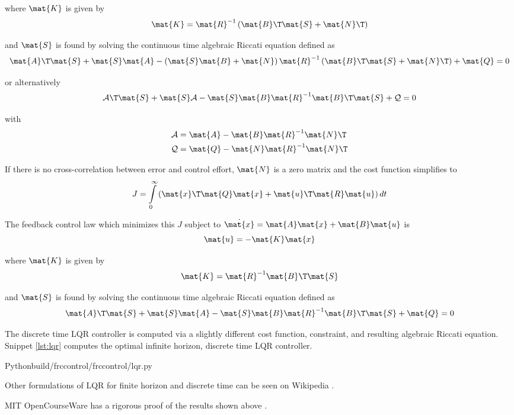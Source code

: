 where $\mat{K}$ is given by
\begin{equation*}
  \mat{K} = \mat{R}^{-1} \left(\mat{B}\T\mat{S} + \mat{N}\T\right)
\end{equation*}

and $\mat{S}$ is found by solving the continuous time algebraic Riccati equation
defined as
\begin{equation*}
  \mat{A}\T\mat{S} + \mat{S}\mat{A} - \left(\mat{S}\mat{B} +
    \mat{N}\right) \mat{R}^{-1} \left(\mat{B}\T\mat{S} + \mat{N}\T\right) +
    \mat{Q} = 0
\end{equation*}

or alternatively
\begin{equation*}
  \mathcal{A}\T\mat{S} + \mat{S}\mathcal{A} -
    \mat{S}\mat{B}\mat{R}^{-1}\mat{B}\T\mat{S} + \mathcal{Q} = 0
\end{equation*}

with
\begin{align*}
  \mathcal{A} &= \mat{A} - \mat{B}\mat{R}^{-1}\mat{N}\T \\
  \mathcal{Q} &= \mat{Q} - \mat{N}\mat{R}^{-1}\mat{N}\T
\end{align*}

If there is no cross-correlation between \gls{error} and \gls{control effort},
$\mat{N}$ is a zero matrix and the cost function simplifies to
\begin{equation*}
  J = \int\limits_0^\infty
    \left(\mat{x}\T\mat{Q}\mat{x} + \mat{u}\T\mat{R}\mat{u}\right) dt
\end{equation*}

The feedback \gls{control law} which minimizes this $J$ subject to
$\dot{\mat{x}} = \mat{A}\mat{x} + \mat{B}\mat{u}$ is
\begin{equation*}
  \mat{u} = -\mat{K}\mat{x}
\end{equation*}

where $\mat{K}$ is given by
\begin{equation*}
  \mat{K} = \mat{R}^{-1}\mat{B}\T\mat{S}
\end{equation*}

and $\mat{S}$ is found by solving the continuous time algebraic Riccati equation
defined as
\begin{equation*}
  \mat{A}\T\mat{S} + \mat{S}\mat{A} -
    \mat{S}\mat{B}\mat{R}^{-1}\mat{B}\T\mat{S} + \mat{Q} = 0
\end{equation*}

The discrete time LQR \gls{controller} is computed via a slightly different cost
function, constraint, and resulting algebraic Riccati equation. Snippet
\ref{lst:lqr} computes the optimal infinite horizon, discrete time LQR
\gls{controller}.
\begin{coderemote}{Python}{build/frccontrol/frccontrol/lqr.py}
  \caption{Infinite horizon, discrete time LQR computation in Python}
  \label{lst:lqr}
\end{coderemote}

Other formulations of LQR for finite horizon and discrete time can be seen on
Wikipedia \cite{bib:wiki_lqr}.

MIT OpenCourseWare has a rigorous proof of the results shown above
\cite{bib:lqr_derivs}.
